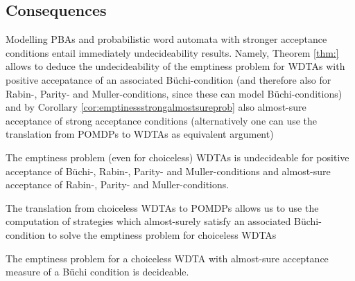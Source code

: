 \subsection{Consequences}
Modelling \acp{PBA} and probabilistic word automata with stronger acceptance 
conditions entail immediately undecideability results. Namely, Theorem 
\ref{thm:} allows to deduce the undecideability of the emptiness 
problem for \acp{WDTA} with positive accepatance of an associated 
Büchi-condition (and therefore also for Rabin-, Parity- and Muller-conditions,
since these can model Büchi-conditions) and by Corollary 
\ref{cor:emptinessstrongalmostsureprob} also almost-sure acceptance of strong
acceptance conditions (alternatively one can use the translation from 
\acp{POMDP} to \acp{WDTA} as equivalent argument)
\begin{corollary}
  The emptiness problem (even for choiceless) \acp{WDTA} is undecideable for
  positive acceptance of Büchi-, Rabin-, Parity- and Muller-conditions and
  almost-sure acceptance of Rabin-, Parity- and Muller-conditions.
\end{corollary}
The translation from choiceless \acp{WDTA} to \acp{POMDP} allows us to use the 
computation of strategies which almost-surely satisfy an associated 
Büchi-condition to solve the emptiness problem for choiceless \acp{WDTA}
\begin{corollary}
  The emptiness problem for a choiceless \ac{WDTA} with almost-sure acceptance 
  measure of a Büchi condition is decideable.
  \label{cor:emptiness}
\end{corollary}

